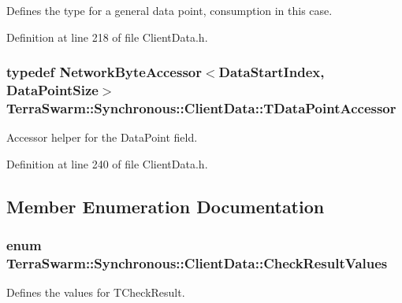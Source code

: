 Defines the type for a general data point, consumption in this case. 



Definition at line 218 of file Client\-Data.\-h.

\hypertarget{class_terra_swarm_1_1_synchronous_1_1_client_data_a69ba4da130856d78eec92c6dcdb61c58}{
\subsubsection[{T\-Data\-Point\-Accessor}]{\setlength{\rightskip}{0pt plus 5cm}typedef {\bf Network\-Byte\-Accessor}$<${\bf Data\-Start\-Index}, {\bf Data\-Point\-Size}$>$ {\bf Terra\-Swarm\-::\-Synchronous\-::\-Client\-Data\-::\-T\-Data\-Point\-Accessor}\hspace{0.3cm}{\ttfamily [private]}}}\label{class_terra_swarm_1_1_synchronous_1_1_client_data_a69ba4da130856d78eec92c6dcdb61c58}


Accessor helper for the Data\-Point field. 



Definition at line 240 of file Client\-Data.\-h.



\subsection{Member Enumeration Documentation}
\hypertarget{class_terra_swarm_1_1_synchronous_1_1_client_data_ab069b9069716e25b2e5be34d2356ec01}{
\subsubsection[{Check\-Result\-Values}]{\setlength{\rightskip}{0pt plus 5cm}enum {\bf Terra\-Swarm\-::\-Synchronous\-::\-Client\-Data\-::\-Check\-Result\-Values}}}\label{class_terra_swarm_1_1_synchronous_1_1_client_data_ab069b9069716e25b2e5be34d2356ec01}


Defines the values for T\-Check\-Result. 

